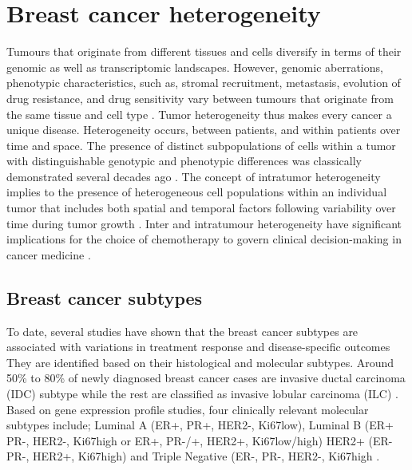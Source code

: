 
\section{Breast cancer heterogeneity}
 Tumours that originate from different tissues and cells diversify in terms of their genomic as well as transcriptomic landscapes.
 However, genomic aberrations, phenotypic characteristics, such as, stromal recruitment, metastasis, evolution of drug resistance, and drug sensitivity vary between tumours that originate from the same tissue and cell type \cite{vogelstein2013cancer}. 
Tumor heterogeneity thus makes every cancer a unique disease. Heterogeneity occurs, between patients, and within patients over time and space. 
The presence of distinct subpopulations of cells within a tumor with distinguishable genotypic and phenotypic differences was classically demonstrated several decades ago \cite{fidler1978tumor}.
The concept of intratumor heterogeneity implies to the presence of heterogeneous cell populations within an individual tumor that includes both spatial and temporal factors following variability over time during tumor growth \cite{ellsworth2017molecular, welch2016tumor}. Inter and intratumour heterogeneity have significant implications for the choice of chemotherapy to govern clinical decision-making in cancer medicine \cite{bedard2013tumour}.








\subsection{Breast cancer subtypes}
To date, several studies have shown that the breast cancer subtypes are associated with variations in treatment response and disease-specific outcomes \cite{metzger2013patterns, arvold2011age} 
They are identified based on their histological and molecular subtypes. 
Around 50\% to 80\% of newly diagnosed breast cancer cases are
invasive ductal carcinoma (IDC) subtype while the rest are
classified as invasive lobular carcinoma (ILC) \cite{henry2019breast}. Based on  gene expression profile studies, four clinically relevant molecular subtypes include; Luminal A (ER+, PR+, HER2-, Ki67low), Luminal B (ER+
PR-, HER2-, Ki67high or ER+, PR-/+, HER2+, Ki67low/high) HER2+ (ER-
PR-, HER2+, Ki67high) and Triple Negative (ER-, PR-, HER2-, Ki67high \cite{nadia2017gm, do2020histological}.


